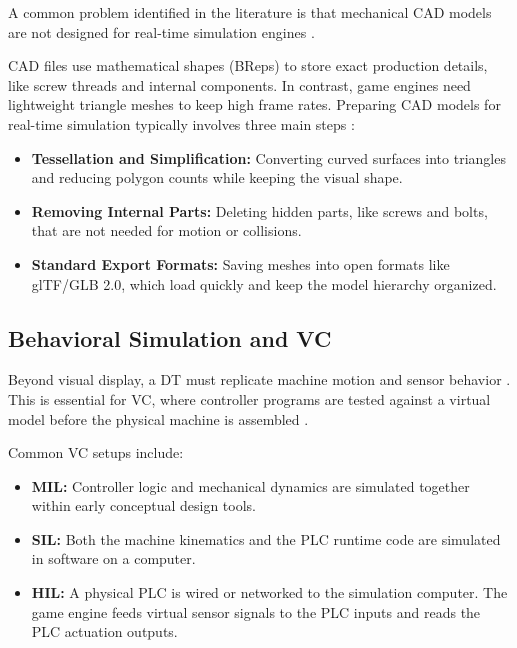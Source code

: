 A common problem identified in the literature is that mechanical \gls{CAD} models are not designed for real-time simulation engines \cite{Chowdhury2025,Striffler2023,Zheng2024}.

\gls{CAD} files use mathematical shapes (\glspl{BRep}) to store exact production details, like screw threads and internal components. In contrast, game engines need lightweight triangle meshes to keep high frame rates. Preparing \gls{CAD} models for real-time simulation typically involves three main steps \cite{Chowdhury2025,Striffler2023}:
\begin{itemize}
    \item \textbf{Tessellation and Simplification:} Converting curved surfaces into triangles and reducing polygon counts while keeping the visual shape.
    \item \textbf{Removing Internal Parts:} Deleting hidden parts, like screws and bolts, that are not needed for motion or collisions.
    \item \textbf{Standard Export Formats:} Saving meshes into open formats like \gls{glTF}/\gls{GLB} 2.0, which load quickly and keep the model hierarchy organized.
\end{itemize}

\subsection{Behavioral Simulation and \texorpdfstring{\gls{VC}}{Virtual Commissioning}}

Beyond visual display, a \gls{DT} must replicate machine motion and sensor behavior \cite{Striffler2023}. This is essential for \gls{VC}, where controller programs are tested against a virtual model before the physical machine is assembled \cite{Lee2014}.

Common \gls{VC} setups include:
\begin{itemize}
    \item \textbf{\gls{MIL}:} Controller logic and mechanical dynamics are simulated together within early conceptual design tools.
    \item \textbf{\gls{SIL}:} Both the machine kinematics and the \gls{PLC} runtime code are simulated in software on a computer.
    \item \textbf{\gls{HIL}:} A physical \gls{PLC} is wired or networked to the simulation computer. The game engine feeds virtual sensor signals to the \gls{PLC} inputs and reads the \gls{PLC} actuation outputs.
\end{itemize}


